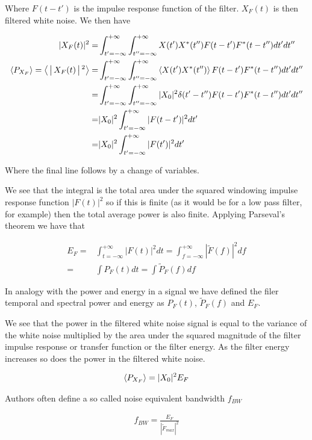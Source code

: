 \documentclass[12pt]{article}
\begin{document}
Where $F(t-t')$ is the impulse response function of the filter.
$X_F(t)$ is then filtered white noise.
We then have

\begin{align}
|X_F(t)|^2 =& \int_{t'=-\infty}^{+\infty} \int_{t'' = -\infty}^{+\infty} X(t')X^*(t'') F(t-t')F^*(t-t'') dt' dt''\\
\Braket{P_{X_F}} = \Braket{|X_F(t)|^2} =& \int_{t'=-\infty}^{+\infty} \int_{t'' = -\infty}^{+\infty} \Braket{X(t')X^*(t'')} F(t-t')F^*(t-t'') dt' dt''\\
=& \int_{t'=-\infty}^{+\infty} \int_{t'' = -\infty}^{+\infty} |X_0|^2\delta(t'-t'') F(t-t')F^*(t-t'') dt' dt''\\
=& |X_0|^2\int_{t'=-\infty}^{+\infty} |F(t-t')|^2 dt'\\
=& |X_0|^2\int_{t'=-\infty}^{+\infty} |F(t')|^2dt'
\end{align}

Where the final line follows by a change of variables.

We see that the integral is the total area under the squared windowing impulse response function $|F(t)|^2$ so if this is finite (as it would be for a low pass filter, for example) then the total average power is also finite.
Applying Parseval's theorem we have that

\begin{align}
E_F =& \int_{t=-\infty}^{+\infty} |F(t)|^2 dt = \int_{f=-\infty}^{+\infty} |\tilde{F}(f)|^2 df\\
=& \int P_F(t) dt = \int \tilde{P}_F(f) df
\end{align}

In analogy with the power and energy in a signal we have defined the filer temporal and spectral power and energy as $P_F(t)$, $\tilde{P}_F(f)$ and $E_F$.

We see that the power in the filtered white noise signal is equal to the variance of the white noise multiplied by the area under the squared magnitude of the filter impulse response or transfer function or the filter energy.
As the filter energy increases so does the power in the filtered white noise.

\begin{align}
\Braket{P_{X_F}} = |X_0|^2 E_F
\end{align}

Authors often define a so called noise equivalent bandwidth $f_{BW}$

\begin{align}
f_{BW} = \frac{E_F}{|\tilde{F}_{max}|^2}
\end{align}
\end{document}
